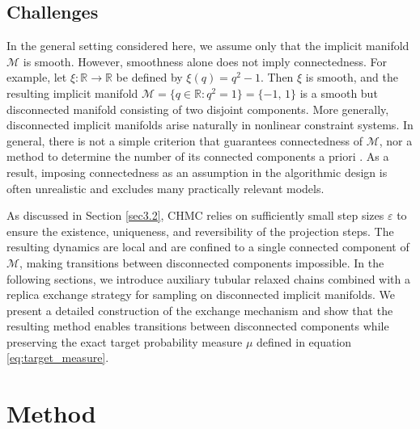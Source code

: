 \documentclass[12pt]{article}
\begin{document}
\subsection{Challenges}\label{sec3.3}
In the general setting considered here, we assume only that the implicit manifold
$\mathcal{M}$ is smooth. However, smoothness alone does not imply connectedness.
For example, let $\xi : \mathbb{R} \to \mathbb{R}$ be defined by
\(
\xi(q) = q^2 - 1.
\)
Then $\xi$ is smooth, and the resulting implicit manifold
\(
\mathcal{M} = \{ q \in \mathbb{R} : q^2 = 1 \} = \{-1,\,1\}
\)
is a smooth but disconnected manifold consisting of two disjoint components.
More generally, disconnected implicit manifolds arise naturally in nonlinear
constraint systems.
In general, there is not a simple criterion that guarantees
connectedness of $\mathcal{M}$, nor a method to determine the number of its connected
components a priori \citep{J18}. As a result, imposing connectedness as an assumption in the
algorithmic design is often unrealistic and excludes many practically relevant models.

As discussed in Section \ref{sec3.2}, CHMC relies on sufficiently small step
sizes $\varepsilon$ to ensure the existence, uniqueness, and reversibility of the
projection steps. The resulting dynamics are local and are
confined to a single connected component of $\mathcal{M}$, making transitions between
disconnected components impossible. 
In the following sections, we introduce auxiliary tubular relaxed chains combined with a
replica exchange strategy for sampling on disconnected implicit manifolds. We present
a detailed construction of the exchange mechanism and show that the resulting method enables
transitions between disconnected components while preserving the exact target
probability measure $\mu$ defined in equation \eqref{eq:target_measure}.


 \section{Method}\label{sec4}
\end{document}

